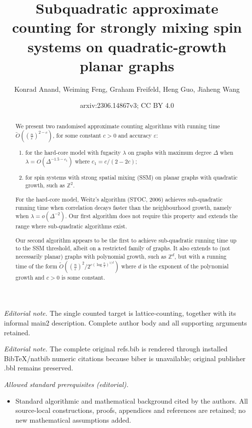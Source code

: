 \documentclass[10pt,a4paper]{article}
\title{Subquadratic approximate counting for strongly mixing spin systems on quadratic-growth planar graphs}
\author{Konrad Anand, Weiming Feng, Graham Freifeld, Heng Guo, Jiaheng Wang}
\date{arxiv:2306.14867v3; CC BY 4.0}
\newcommand{\eps}{\varepsilon}
\begin{document}
\maketitle
\noindent\textit{Editorial note.} The single counted target is lattice-counting, together with its informal main2 description. Complete author body and all supporting arguments retained.\par\medskip
\noindent\textit{Editorial note.} The complete original refs.bib is rendered through installed BibTeX/natbib numeric citations because biber is unavailable; original publisher .bbl remains preserved.\par\medskip
\noindent\textit{Allowed standard prerequisites (editorial).}\begin{itemize}
\item Standard algorithmic and mathematical background cited by the authors. All source-local constructions, proofs, appendices and references are retained; no new mathematical assumptions added.
\end{itemize}\medskip

\begin{abstract}
  We present two randomised approximate counting algorithms with running time $\widetilde{O}\left(\left(\frac{n}{\eps}\right)^{2-c}\right)$, for some constant $c>0$ and accuracy $\eps$:
  \begin{enumerate}
    \item for the hard-core model with fugacity $\lambda$ on graphs with maximum degree $\Delta$ when $\lambda=O(\Delta^{-1.5-c_1})$ where $c_1=c/(2-2c)$;
    \item for spin systems with strong spatial mixing (SSM) on planar graphs with quadratic growth, such as $\mathbb{Z}^2$.
  \end{enumerate}

  For the hard-core model, Weitz's algorithm (STOC, 2006) achieves sub-quadratic running time when correlation decays faster than the neighbourhood growth, namely when $\lambda = o(\Delta^{-2})$.
  Our first algorithm does not require this property and extends the range where sub-quadratic algorithms exist.

  Our second algorithm appears to be the first to achieve sub-quadratic running time up to the SSM threshold, albeit on a restricted family of graphs.
  It also extends to (not necessarily planar) graphs with polynomial growth, such as $\mathbb{Z}^d$,
  but with a running time of the form $\widetilde{O}\left(\left(\frac{n}{\eps}\right)^{2}/2^{c(\log \frac{n}{\eps})^{1/d}}\right)$ where $d$ is the exponent of the polynomial growth and $c>0$ is some constant.
\end{abstract}
\end{document}
